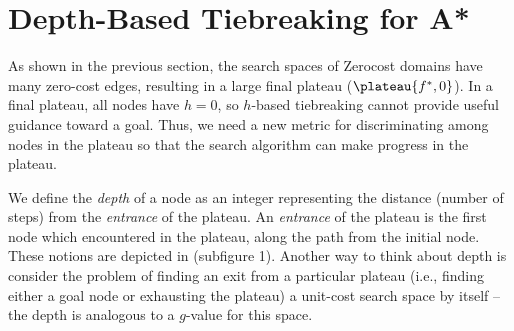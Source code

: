 \section{Depth-Based Tiebreaking for A*}

\label{sec:depth}

As shown in the previous section, the search spaces of Zerocost domains have many zero-cost edges,
resulting in a large final plateau ($\plateau{f^*,0}$). In a final plateau,
all nodes have $h=0$, so $h$-based tiebreaking cannot provide
useful guidance toward a goal. Thus, we need a new metric for discriminating among nodes
in the plateau so that the search algorithm can make progress in the plateau.

We define the \emph{depth} of a node as an 
integer representing the distance (number of steps) from the
\emph{entrance} of the plateau.  An \emph{entrance} of the plateau is
the first node which encountered in the plateau, along the path from the
initial node. These notions are depicted in
 (subfigure 1). 
Another way to think about depth is consider the problem of finding an exit from a particular plateau (i.e., finding either a goal node or exhausting the plateau) a unit-cost search space by itself -- the depth is analogous to a $g$-value for this space.

